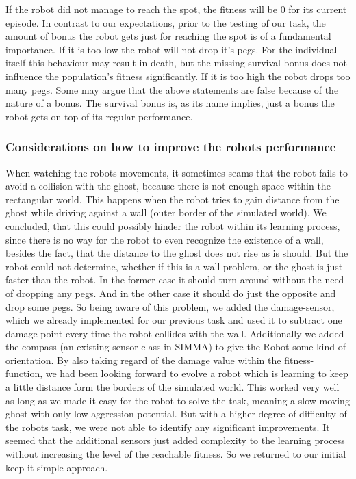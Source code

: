 \documentclass[12pt,fleqn,a4paper]{article}
\begin{document}
If the robot did not manage to reach the spot, the fitness will be 0 for its current episode. 
In contrast to our expectations, prior to the testing of our task, the amount of bonus the robot gets just for reaching the spot is of a fundamental importance. If it is too low the robot will not drop it's pegs. For the individual itself this behaviour may result in death, but the missing survival bonus does not influence the population's fitness significantly. If it is too high the robot drops too many pegs. Some may argue that the above statements are false because of the nature of a bonus. 
The survival bonus is, as its name implies, just a bonus the robot gets on top of its regular performance.


\subsubsection{Considerations on how to improve the robots performance}

When watching the robots movements, it sometimes seams that the robot fails to avoid a collision with the ghost, because there is not enough space within the rectangular world. This happens when the robot tries to gain distance from the ghost while driving against a wall (outer border of the simulated world). We concluded, that this could possibly hinder the robot within its learning process, since there is no way for the robot to even recognize the existence of a wall, besides the fact, that the distance to the ghost does not rise as is should. But the robot could not determine, whether if this is a wall-problem, or the ghost is just faster than the robot. In the former case it should turn around without the need of dropping any pegs. And in the other case it should do just the opposite and drop some pegs. So being aware of this problem, we added the damage-sensor, which we already implemented for our previous task and used it to subtract one damage-point every time the robot collides with the wall. Additionally we added the compass (an existing sensor class in SIMMA) to give the Robot some kind of orientation. By also taking regard of the damage value within the fitness-function, we had been looking forward to evolve a robot which is learning to keep a little distance form the borders of the simulated world. This worked very well as long as we made it easy for the robot to solve the task, meaning a slow moving ghost with only low aggression potential. But with a higher degree of difficulty of the robots task, we were not able to identify any significant improvements. It seemed that the additional sensors just added complexity to the learning process without increasing the level of the reachable fitness. So we returned to our initial keep-it-simple approach.
\end{document}
